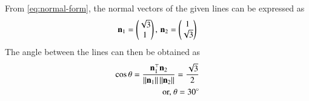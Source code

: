 	From \eqref{eq:normal-form}, 
 the normal vectors of the given lines can be expressed as
   \begin{align}
	   \mathbf{n}_1=\begin{pmatrix}\sqrt{3}\\1\end{pmatrix},\,
	   \mathbf{n}_2=\begin{pmatrix}1\\\sqrt{3}\end{pmatrix}
   \end{align}
The angle between the lines can then be 
obtained as
\begin{align}
	\cos\theta=\frac{\mathbf{n}_1^\top\mathbf{n}_2}{\left\lVert\mathbf{n}_1\right\rVert\left\lVert\mathbf{n}_2\right\rVert}
	=\frac{\sqrt{3}}{2} 
	\\
	\text{or, }
\theta=30\degree
\end{align}

